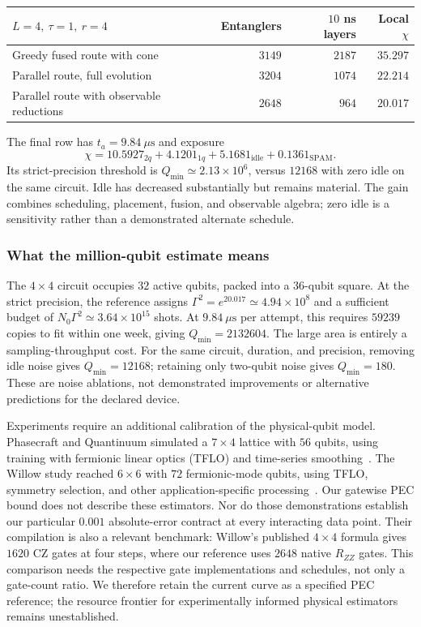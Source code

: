 \documentclass[11pt]{article}
\begin{document}
\begin{center}
\begin{tabular}{lrrr}
\toprule
$L=4,\ \tau=1,\ r=4$ & Entanglers & $10$ ns layers & Local $\chi$\\
\midrule
Greedy fused route with cone & $3149$ & $2187$ & $35.297$\\
Parallel route, full evolution & $3204$ & $1074$ & $22.214$\\
Parallel route with observable reductions & $2648$ & $964$ & $20.017$\\
\bottomrule
\end{tabular}
\end{center}
The final row has $t_a=9.84~\mu\mathrm{s}$ and exposure
\begin{equation}
 \chi=10.5927_{2q}+4.1201_{1q}+5.1681_{\mathrm{idle}}+0.1361_{\mathrm{SPAM}}.
\end{equation}
Its strict-precision threshold is $Q_{\min}\simeq2.13\times10^6$, versus
$12168$ with zero idle on the same circuit. Idle has decreased substantially
but remains material. The gain combines scheduling, placement, fusion, and
observable algebra; zero idle is a sensitivity rather than a demonstrated
alternate schedule.

\subsubsection{What the million-qubit estimate means}
The $4\times4$ circuit occupies $32$ active qubits, packed into a $36$-qubit
square. At the strict precision, the reference assigns
$\Gamma^2=e^{20.017}\simeq4.94\times10^8$ and a sufficient budget of
$N_0\Gamma^2\simeq3.64\times10^{15}$ shots. At $9.84~\mu\mathrm{s}$ per
attempt, this requires $59239$ copies to fit within one week, giving
$Q_{\min}=2132604$. The large area is entirely a sampling-throughput cost.
For the same circuit, duration, and precision, removing idle noise gives
$Q_{\min}=12168$; retaining only two-qubit noise gives $Q_{\min}=180$.
These are noise ablations, not demonstrated improvements or alternative
predictions for the declared device.

Experiments require an additional calibration of the physical-qubit model.
Phasecraft and Quantinuum simulated a $7\times4$ lattice with $56$ qubits,
using training with fermionic linear optics (TFLO) and time-series
smoothing~\cite{alam2025}. The Willow study reached $6\times6$ with $72$
fermionic-mode qubits, using TFLO, symmetry selection, and other
application-specific processing~\cite{phasecraftwillow2025}. Our gatewise
PEC bound does not describe these estimators. Nor do those demonstrations
establish our particular $0.001$ absolute-error contract at every
interacting data point. Their compilation is also a relevant benchmark:
Willow's published $4\times4$ formula gives $1620$ CZ gates at four steps,
where our reference uses $2648$ native $R_{ZZ}$ gates. This comparison needs
the respective gate implementations and schedules, not only a gate-count
ratio. We therefore retain the current curve as a specified PEC reference;
the resource frontier for experimentally informed physical estimators
remains unestablished.
\end{document}
